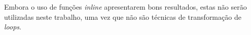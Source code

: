 Embora o uso de funções \textit{inline} apresentarem bons resultados, estas não
serão utilizadas neste trabalho, uma vez que não são técnicas de transformação
de \textit{loops}.


%
%
%
%
%
%





